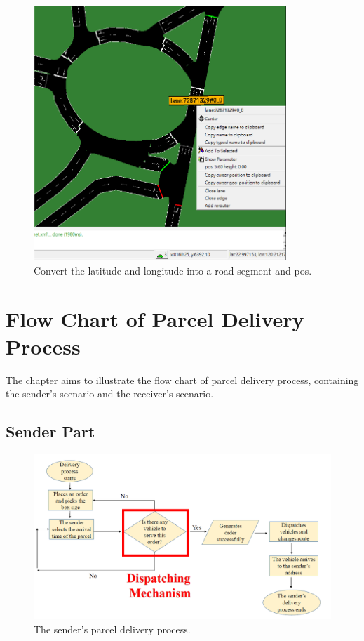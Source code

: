 \documentclass[12pt]{ksthesis}
\begin{document}
\begin{thesis}
{\begin{figure}[H]
\centering
\includegraphics[width=0.85\textwidth]{./Thesis_figures/F4-6_GPS_SUMOMap.PNG}
\caption{\large Convert the latitude and longitude into a road segment and pos.}
\vspace{0.5cm}
\label{Fig:Convert_To_Road}
\end{figure}




\chapter{Flow Chart of Parcel Delivery Process}\label{Chap:Flow Chart of Parcel Delivery Process}

The chapter aims to illustrate the flow chart of parcel delivery process, containing the sender’s scenario and the receiver’s scenario.

\section{Sender Part}

\begin{figure}[H]
\centering
\includegraphics[width=1.14\textwidth]{./Thesis_figures/F5-1_sender_delivery_process.PNG}
\caption{\large The sender’s parcel delivery process.}
\vspace{0.5cm}
\label{Fig:sender_process}
\end{figure}

}
\end{thesis}
\end{document}
